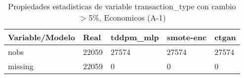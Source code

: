\begin{table}[H]
\centering
\fontsize{8}{14}\selectfont
\caption{Propiedades estadisticas de variable transaction\_type con cambio\ensuremath{>}5\%, Economicos (A-1)}
\label{table-stats-economicos-a-1-transaction_type-short}
\begin{tabular}{|l|m{10em}|m{10em}|m{10em}|m{10em}|}
\hline
 \rowcolor[gray]{0.8}
Variable/Modelo & Real & tddpm\_mlp & smote-enc & ctgan \\
\hline nobs & 22059 & 27574 & 27574 & 27574 \\
\hline missing & 22059 & 0 & 0 & 0 \\
\hline
\end{tabular}
\end{table}
